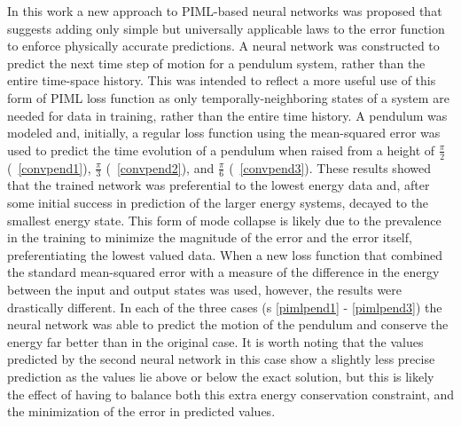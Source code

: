 \documentclass[3p]{elsarticle}
\begin{document}
In this work a new approach to PIML-based neural networks was proposed that suggests adding only simple but universally applicable laws to the error function to enforce physically accurate predictions.
A neural network was constructed to predict the next time step of motion for a pendulum system, rather than the entire time-space history. This was intended to reflect a more useful use of this form of PIML loss function as only temporally-neighboring states of a system are needed for data in training, rather than the entire time history. A pendulum was modeled and, initially, a regular loss function using the mean-squared error was used to predict the time evolution of a pendulum when raised from a height of $\frac{\pi}{2}$ (\figurename~\ref{convpend1}), $\frac{\pi}{3}$ (\figurename~\ref{convpend2}), and $\frac{\pi}{6}$ (\figurename~\ref{convpend3}). These results showed that the trained network was preferential to the lowest energy data and, after some initial success in prediction of the larger energy systems, decayed to the smallest energy state. This form of mode collapse is likely due to the prevalence in the training to minimize the magnitude of the error and the error itself, preferentiating the lowest valued data. When a new loss function that combined the standard mean-squared error with a measure of the difference in the energy between the input and output states was used, however, the results were drastically different. In each of the three cases (\figurename s \ref{pimlpend1} - \ref{pimlpend3}) the neural network was able to predict the motion of the pendulum and conserve the energy far better than in the original case. It is worth noting that the values predicted by the second neural network in this case show a slightly less precise prediction as the values lie above or below the exact solution, but this is likely the effect of having to balance both this extra energy conservation constraint, and the minimization of the error in predicted values.\\
\end{document}
